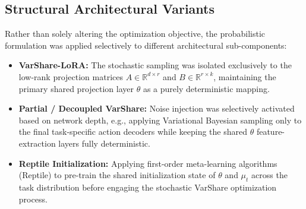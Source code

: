 \documentclass[11pt,a4paper]{article}
\begin{document}
\subsection{Structural Architectural Variants}
Rather than solely altering the optimization objective, the probabilistic formulation was applied selectively to different architectural sub-components:
\begin{itemize}
    \item \textbf{VarShare-LoRA:} The stochastic sampling was isolated exclusively to the low-rank projection matrices $A \in \mathbb{R}^{d \times r}$ and $B \in \mathbb{R}^{r \times k}$, maintaining the primary shared projection layer $\theta$ as a purely deterministic mapping.
    \item \textbf{Partial / Decoupled VarShare:} Noise injection was selectively activated based on network depth, e.g., applying Variational Bayesian sampling only to the final task-specific action decoders while keeping the shared $\theta$ feature-extraction layers fully deterministic.
    \item \textbf{Reptile Initialization:} Applying first-order meta-learning algorithms (Reptile) to pre-train the shared initialization state of $\theta$ and $\mu_t$ across the task distribution before engaging the stochastic VarShare optimization process.
\end{itemize}
\end{document}
